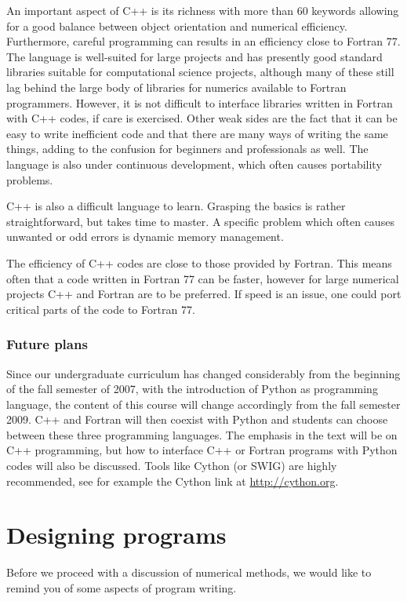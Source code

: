 An important aspect of C++ is its richness with more than 60 keywords allowing for a good balance between object orientation
and numerical efficiency. Furthermore, careful programming can results in an efficiency close to
Fortran 77.  The language is well-suited for large projects and has presently good standard libraries suitable
for computational science projects, although many of these still lag behind the large body of libraries for numerics
available to Fortran programmers. However, it is not difficult to interface libraries written in Fortran with C++
codes, if care is exercised.
Other weak sides are the fact that it can be easy to write inefficient code  and that there are many ways of writing the
same things, adding to the confusion for beginners  and professionals as well.  The language is also under continuous
development, which often causes portability problems.

C++ is also a difficult language to learn. Grasping the basics is rather straightforward, but takes time
to master. A specific problem which often causes 
unwanted or odd errors is dynamic memory management.

The efficiency of C++ codes are close to those provided by Fortran. This means often that a code
written in Fortran 77 can be faster, however  for large numerical projects C++ and Fortran 
are to be preferred. If speed is an issue, one could port critical parts of the code to Fortran 77.

\subsubsection{Future plans}
Since our undergraduate curriculum has changed considerably from the beginning of the fall
semester of 2007, with
the introduction of Python as programming language, the content of this course will change accordingly
from the fall semester 2009. C++ and Fortran will then coexist with Python and students can choose
between these three programming languages. 
The emphasis in the  text will be on C++ programming, but how to interface C++ or Fortran programs
with Python codes will also be discussed. Tools like Cython (or SWIG) are highly recommended, see for example the Cython link at \url{http://cython.org}. 
\section{Designing programs}
Before we proceed with a discussion of numerical methods, we would like to remind
you of some aspects of program writing.

